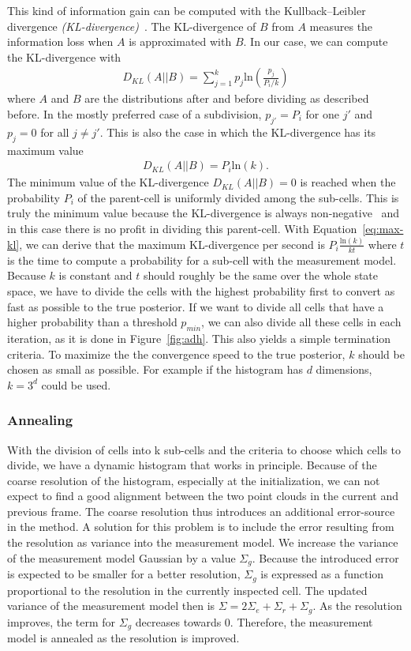 \documentclass[twoside,a4paper,article]{combine}
\begin{document}
This kind of information gain can be computed with the
Kullback–Leibler divergence \textit{(KL-divergence)}~\cite{kl-divergence}. The
KL-divergence of $B$ from $A$ measures the information loss when $A$
is approximated with $B$. In our case, we can compute the
KL-divergence with
\begin{align}
  D_{KL}(A||B)=\sum_{j=1}^k p_j \mathrm{ln}\left(\frac{p_j}{P_i/k}\right)
\end{align}
where $A$ and $B$ are the distributions after and before dividing as
described before. In the mostly preferred case of a subdivision,
$p_{j'}=P_i$ for one $j'$ and $p_j=0$ for all $j\neq j'$. This is also
the case in which the KL-divergence has its maximum value
\begin{align}
  D_{KL}(A||B)=P_i \mathrm{ln}(k) \mathrm{ . }
  \label{eq:max-kl}
\end{align}
The minimum value of the KL-divergence $D_{KL}(A||B)=0$ is reached
when the probability $P_i$ of the parent-cell is uniformly divided
among the sub-cells. This is truly the minimum value because the
KL-divergence is always non-negative~\cite{kl-divergence} and in this
case there is no profit in dividing this parent-cell. With
Equation~\ref{eq:max-kl}, we can derive that the maximum KL-divergence
per second is $P_i \frac{\mathrm{ln } (k)}{kt}$ where $t$ is the time
to compute a probability for a sub-cell with the measurement
model. Because $k$ is constant and $t$ should roughly be the same over
the whole state space, we have to divide the cells with the highest
probability first to convert as fast as possible to the true
posterior. If we want to divide all cells that have a higher
probability than a threshold $p_{min}$, we can also divide all these
cells in each iteration, as it is done in Figure~\ref{fig:adh}. This
also yields a simple termination criteria. To maximize the the
convergence speed to the true posterior, $k$ should be chosen as small
as possible. For example if the histogram has $d$ dimensions, $k=3^d$
could be used.

\subsubsection{Annealing}
\label{sub:annealing}
With the division of cells into k sub-cells and the criteria to choose
which cells to divide, we have a dynamic histogram that works in
principle. Because of the coarse resolution of the histogram,
especially at the initialization, we can not expect to find a good
alignment between the two point clouds in the current and previous
frame. The coarse resolution thus introduces an additional
error-source in the method. A solution for this problem is to include
the error resulting from the resolution as variance into the
measurement model. We increase the variance of the measurement model
Gaussian by a value $\Sigma_g$. Because the introduced error is
expected to be smaller for a better resolution, $\Sigma_g$ is
expressed as a function proportional to the resolution in the
currently inspected cell. The updated variance of the measurement
model then is $\Sigma = 2\Sigma_e+\Sigma_r+\Sigma_g$. As the
resolution improves, the term for $\Sigma_g$ decreases towards $0$.
Therefore, the
measurement model is annealed as the resolution is improved.
\end{document}

